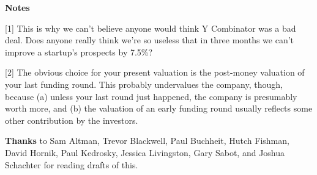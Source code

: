 \textbf{Notes}

[1] This is why we can't believe anyone would think Y
                  Combinator was a bad deal. Does anyone really think we're so
                  useless that in three months we can't improve a startup's
                  prospects by 7.5\%?
                  

[2] The obvious choice for your present valuation is the
                  post-money valuation of your last funding round. This probably
                  undervalues the company, though, because (a) unless your last
                  round just happened, the company is presumably worth more, and
                  (b) the valuation of an early funding round usually reflects
                  some other contribution by the investors.

\textbf{Thanks}
                  to Sam Altman, Trevor Blackwell, Paul Buchheit, Hutch Fishman,
                  David Hornik, Paul Kedrosky, Jessica Livingston, Gary Sabot,
                  and Joshua Schachter for reading drafts of this.


              
            
          
            
              
                


                  
              
            
          
